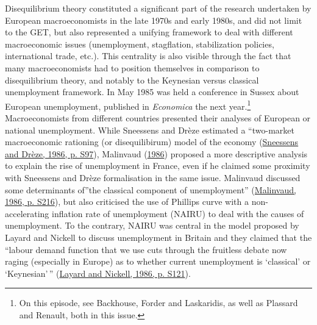 \documentclass[]{elsarticle} %
\begin{document}
Disequilibrium theory constituted a significant part of the research
undertaken by European macroeconomists in the late 1970s and early
1980s, and did not limit to the GET, but also represented a unifying
framework to deal with different macroeconomic issues (unemployment,
stagflation, stabilization policies, international trade, etc.). This
centrality is also visible through the fact that many macroeconomists
had to position themselves in comparison to disequilibrium theory, and
notably to the Keynesian versus classical unemployment framework. In May
1985 was held a conference in Sussex about European unemployment,
published in \emph{Economica} the next year.\footnote{On this episode,
  see Backhouse, Forder and Laskaridis, as well as Plassard and Renault,
  both in this issue.} Macroeconomists from different countries
presented their analyses of European or national unemployment. While
Sneessens and Drèze estimated a ``two-market macroeconomic rationing (or
disequilibirum) model of the economy
(\protect\hyperlink{ref-sneessens1986}{Sneessens and Drèze, 1986, p.
S97}), Malinvaud (\protect\hyperlink{ref-malinvaud1986}{1986}) proposed
a more descriptive analysis to explain the rise of unemployment in
France, even if he claimed some proximity with Sneessens and Drèze
formalisation in the same issue. Malinvaud discussed some determinants
of''the classical component of unemployment''
(\protect\hyperlink{ref-malinvaud1986}{Malinvaud, 1986, p. S216}), but
also criticised the use of Phillips curve with a non-accelerating
inflation rate of unemployment (NAIRU) to deal with the causes of
unemployment. To the contrary, NAIRU was central in the model proposed
by Layard and Nickell to discuss unemployment in Britain and they
claimed that the ``labour demand function that we use cuts through the
fruitless debate now raging (especially in Europe) as to whether current
unemployment is `classical' or `Keynesian'\,''
(\protect\hyperlink{ref-layard1986}{Layard and Nickell, 1986, p. S121}).
\end{document}
